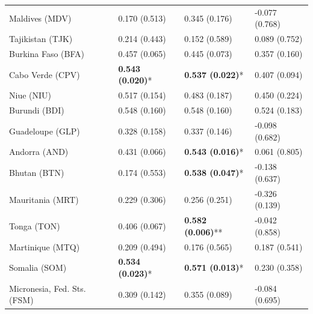 \begin{longtable}{p{5cm}p{3cm}p{3cm}p{5cm}}
Maldives (MDV) & \textcolor{atlOrange600}{0.170 (0.513)} & \textcolor{atlOrange600}{0.345 (0.176)} & \textcolor{atlOrange600}{-0.077 (0.768)} \\
Tajikistan (TJK) & \textcolor{atlOrange600}{0.214 (0.443)} & \textcolor{atlOrange600}{0.152 (0.589)} & \textcolor{atlOrange600}{0.089 (0.752)} \\
Burkina Faso (BFA) & \textcolor{atlOrange600}{0.457 (0.065)} & \textcolor{atlOrange600}{0.445 (0.073)} & \textcolor{atlOrange600}{0.357 (0.160)} \\
Cabo Verde (CPV) & \textcolor{atlLime600}{\textbf{0.543 (0.020)}*} & \textcolor{atlLime600}{\textbf{0.537 (0.022)}*} & \textcolor{atlOrange600}{0.407 (0.094)} \\
Niue (NIU) & \textcolor{atlOrange600}{0.517 (0.154)} & \textcolor{atlOrange600}{0.483 (0.187)} & \textcolor{atlOrange600}{0.450 (0.224)} \\
Burundi (BDI) & \textcolor{atlOrange600}{0.548 (0.160)} & \textcolor{atlOrange600}{0.548 (0.160)} & \textcolor{atlOrange600}{0.524 (0.183)} \\
Guadeloupe (GLP) & \textcolor{atlOrange600}{0.328 (0.158)} & \textcolor{atlOrange600}{0.337 (0.146)} & \textcolor{atlOrange600}{-0.098 (0.682)} \\
Andorra (AND) & \textcolor{atlOrange600}{0.431 (0.066)} & \textcolor{atlLime600}{\textbf{0.543 (0.016)}*} & \textcolor{atlOrange600}{0.061 (0.805)} \\
Bhutan (BTN) & \textcolor{atlOrange600}{0.174 (0.553)} & \textcolor{atlLime600}{\textbf{0.538 (0.047)}*} & \textcolor{atlOrange600}{-0.138 (0.637)} \\
Mauritania (MRT) & \textcolor{atlOrange600}{0.229 (0.306)} & \textcolor{atlOrange600}{0.256 (0.251)} & \textcolor{atlOrange600}{-0.326 (0.139)} \\
Tonga (TON) & \textcolor{atlOrange600}{0.406 (0.067)} & \textcolor{atlLime600}{\textbf{0.582 (0.006)}**} & \textcolor{atlOrange600}{-0.042 (0.858)} \\
Martinique (MTQ) & \textcolor{atlOrange600}{0.209 (0.494)} & \textcolor{atlOrange600}{0.176 (0.565)} & \textcolor{atlOrange600}{0.187 (0.541)} \\
Somalia (SOM) & \textcolor{atlLime600}{\textbf{0.534 (0.023)}*} & \textcolor{atlLime600}{\textbf{0.571 (0.013)}*} & \textcolor{atlOrange600}{0.230 (0.358)} \\
Micronesia, Fed. Sts. (FSM) & \textcolor{atlOrange600}{0.309 (0.142)} & \textcolor{atlOrange600}{0.355 (0.089)} & \textcolor{atlOrange600}{-0.084 (0.695)} \\

\end{longtable}
